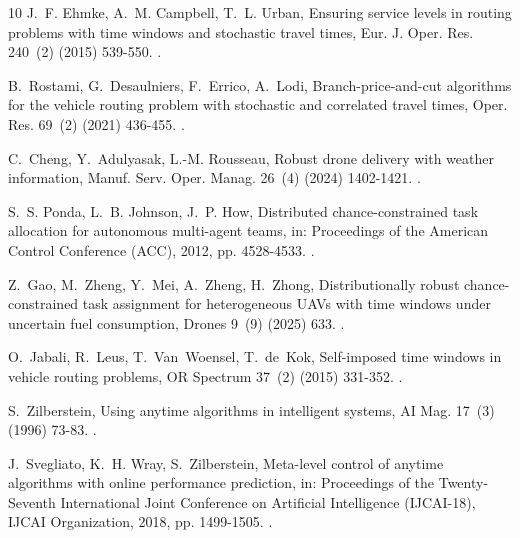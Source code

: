 \documentclass[a4paper,fleqn]{cas-dc}
\begin{document}
\begin{thebibliography}{10}
J.~F. Ehmke, A.~M. Campbell, T.~L. Urban, Ensuring service levels in routing
  problems with time windows and stochastic travel times, Eur. J. Oper. Res.
  240~(2) (2015) 539-550.
\newblock \href {https://doi.org/10.1016/j.ejor.2014.06.045}
  {}.

B.~Rostami, G.~Desaulniers, F.~Errico, A.~Lodi, Branch-price-and-cut algorithms
  for the vehicle routing problem with stochastic and correlated travel times,
  Oper. Res. 69~(2) (2021) 436-455.
\newblock \href {https://doi.org/10.1287/opre.2020.2037}
  {}.

C.~Cheng, Y.~Adulyasak, L.-M. Rousseau, Robust drone delivery with weather
  information, Manuf. Serv. Oper. Manag. 26~(4) (2024) 1402-1421.
\newblock \href {https://doi.org/10.1287/msom.2022.0339}
  {}.

S.~S. Ponda, L.~B. Johnson, J.~P. How, Distributed chance-constrained task
  allocation for autonomous multi-agent teams, in: Proceedings of the American
  Control Conference (ACC), 2012, pp. 4528-4533.
\newblock \href {https://doi.org/10.1109/ACC.2012.6315626}
  {}.

Z.~Gao, M.~Zheng, Y.~Mei, A.~Zheng, H.~Zhong, Distributionally robust
  chance-constrained task assignment for heterogeneous {UAVs} with time windows
  under uncertain fuel consumption, Drones 9~(9) (2025) 633.
\newblock \href {https://doi.org/10.3390/drones9090633}
  {}.

O.~Jabali, R.~Leus, T.~Van~Woensel, T.~de~Kok, Self-imposed time windows in
  vehicle routing problems, OR Spectrum 37~(2) (2015) 331-352.
\newblock \href {https://doi.org/10.1007/s00291-013-0348-1}
  {}.

S.~Zilberstein, Using anytime algorithms in intelligent systems, AI Mag. 17~(3)
  (1996) 73-83.
\newblock \href {https://doi.org/10.1609/aimag.v17i3.1232}
  {}.

J.~Svegliato, K.~H. Wray, S.~Zilberstein, Meta-level control of anytime
  algorithms with online performance prediction, in: Proceedings of the
  Twenty-Seventh International Joint Conference on Artificial Intelligence
  (IJCAI-18), IJCAI Organization, 2018, pp. 1499-1505.
\newblock \href {https://doi.org/10.24963/ijcai.2018/208}
  {}.


\end{thebibliography}
\end{document}
